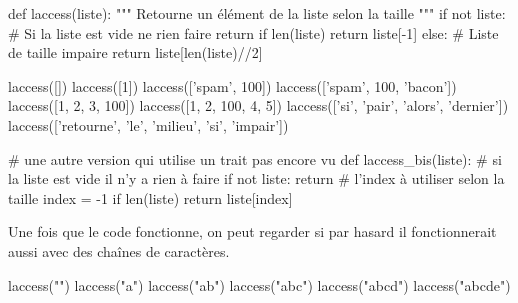 \begin{solution}
\vspace{-\baselineskip}
\begin{idleconsole}
\begin{pyconsole}
def laccess(liste):
    """
    Retourne un élément de la liste selon la taille
    """
    if not liste: # Si la liste est vide ne rien faire
        return
    if len(liste) %
        return liste[-1]
    else:                   # Liste de taille impaire
        return liste[len(liste)//2]

laccess([])
laccess([1])
laccess(['spam', 100])
laccess(['spam', 100, 'bacon'])
laccess([1, 2, 3, 100])
laccess([1, 2, 100, 4, 5])
laccess(['si', 'pair', 'alors', 'dernier'])
laccess(['retourne', 'le', 'milieu', 'si', 'impair'])

# une autre version qui utilise un trait pas encore vu
def laccess_bis(liste):
    # si la liste est vide il n'y a rien à faire
    if not liste:
        return
    # l'index à utiliser selon la taille
    index = -1 if len(liste) %
    return liste[index]

\end{pyconsole}
\end{idleconsole}


Une fois que le code fonctionne, on peut regarder si par hasard il fonctionnerait aussi avec des chaînes de caractères.

\begin{idleconsole}
\begin{pyconsole}
laccess("")
laccess("a")
laccess("ab")
laccess("abc")
laccess("abcd")
laccess("abcde")
\end{pyconsole}
\end{idleconsole}
\end{solution}

\vspace{2pt}

